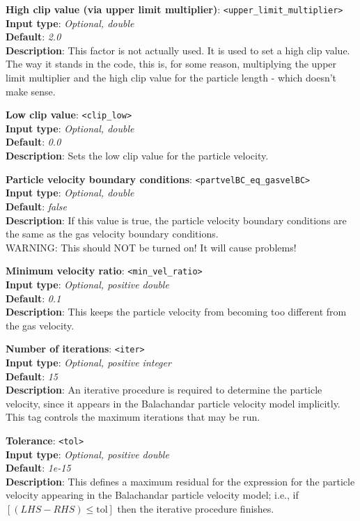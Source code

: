 \begin{enumerate}
{\color[gray]{0.5}
\item {\bf High clip value (via upper limit multiplier)}: \verb=<upper_limit_multiplier>= \\
{\bf Input type}: {\it Optional, double} \\
{\bf Default}: {\it 2.0} \\
{\bf Description}: This factor is not actually used.  It is used to set a high clip value.  The way it stands in the code, this is, for some reason, multiplying the upper limit multiplier and the high clip value for the particle length - which doesn't make sense.
}
%
\item {\bf Low clip value}: \verb=<clip_low>= \\
{\bf Input type}: {\it Optional, double} \\
{\bf Default}: {\it 0.0} \\
{\bf Description}: Sets the low clip value for the particle velocity.
%
{\color[gray]{0.5}
\item {\bf Particle velocity boundary conditions}: \verb=<partvelBC_eq_gasvelBC>= \\
{\bf Input type}: {\it Optional, double} \\
{\bf Default}: {\it false} \\
{\bf Description}: If this value is true, the particle velocity boundary conditions are the same as the gas velocity boundary conditions.  \\
WARNING: This should NOT be turned on!  It will cause problems!
}
%
\item {\bf Minimum velocity ratio}: \verb=<min_vel_ratio>= \\
{\bf Input type}: {\it Optional, positive double} \\
{\bf Default}: {\it 0.1} \\
{\bf Description}: This keeps the particle velocity from becoming too different from the gas velocity.
%
\item {\bf Number of iterations}: \verb=<iter>= \\
{\bf Input type}: {\it Optional, positive integer} \\
{\bf Default}: {\it 15} \\
{\bf Description}: An iterative procedure is required to determine the particle velocity, since it appears in the Balachandar particle velocity model implicitly. This tag controls the maximum iterations that may be run.
%
\item {\bf Tolerance}: \verb=<tol>= \\
{\bf Input type}: {\it Optional, positive double} \\
{\bf Default}: {\it 1e-15} \\
{\bf Description}: This defines a maximum residual for the expression for the particle velocity appearing in the Balachandar particle velocity model; i.e., if $\left[ (LHS - RHS) \leq \text{tol} \right]$ then the iterative procedure finishes.
%
\end{enumerate}



